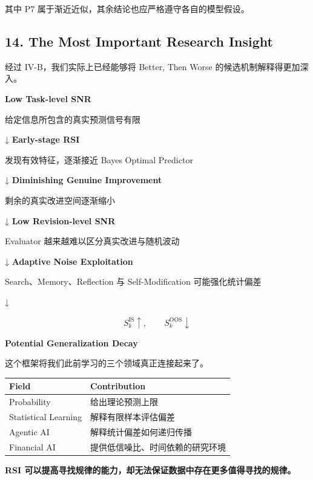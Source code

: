其中 P7 属于渐近近似，其余结论也应严格遵守各自的模型假设。

\hypertarget{part-4-60-0001-the-most-important-research-insight}{%
\subsection{14. The Most Important Research Insight}\label{part-4-60-0001-the-most-important-research-insight}}

经过 IV-B，我们实际上已经能够将 Better, Then Worse 的候选机制解释得更加深入。

\textbf{Low Task-level SNR}

给定信息所包含的真实预测信号有限

↓ \textbf{Early-stage RSI}

发现有效特征，逐渐接近 Bayes Optimal Predictor

↓ \textbf{Diminishing Genuine Improvement}

剩余的真实改进空间逐渐缩小

↓ \textbf{Low Revision-level SNR}

Evaluator 越来越难以区分真实改进与随机波动

↓ \textbf{Adaptive Noise Exploitation}

Search、Memory、Reflection 与 Self-Modification 可能强化统计偏差

↓

\[S_k^{\mathrm{IS}}\uparrow,\qquad S_k^{\mathrm{OOS}}\downarrow\]

\textbf{Potential Generalization Decay}

这个框架将我们此前学习的三个领域真正连接起来了。

\begin{readertable}
\begin{longtable}[]{@{}
  >{\raggedright\arraybackslash}p{}
  >{\raggedright\arraybackslash}p{}@{}}
\toprule
Field & Contribution \\
\midrule
\endhead
Probability & 给出理论预测上限 \\
Statistical Learning & 解释有限样本评估偏差 \\
Agentic AI & 解释统计偏差如何递归传播 \\
Financial AI & 提供低信噪比、时间依赖的研究环境 \\
\bottomrule
\end{longtable}
\end{readertable}

\textbf{RSI 可以提高寻找规律的能力，却无法保证数据中存在更多值得寻找的规律。}


